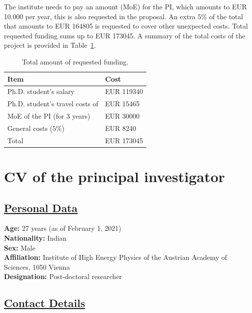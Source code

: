 \documentclass[a4paper,11pt]{article}
\begin{document}
{The institute needs to pay an amount (MoE) for the PI, which amounts to EUR 10.000 per year, 
this is also requested in the proposal.
An extra $5\%$ of the total that amounts to EUR 164805 is requested to cover other unexpected costs.  
Total requested funding sums up to EUR 173045.  
A summary of the total costs of the project is provided in Table~\ref{Tab:Total_cost}.
\begin{table}
\caption{Total amount of requested funding.}
\begin{tabular}{m{6 cm}| m{4 cm}}
Item & Cost  \\
\hline 
Ph.D. student's salary & EUR 119340  \\
Ph.D. student's travel costs of & EUR 15465 \\
MoE of the PI (for 3 years) & EUR 30000 \\
\hline
General costs ($5\%$) & EUR 8240  \\
\hline
Total & EUR 173045 
\end{tabular}
\label{Tab:Total_cost}
\end{table}

\newpage


\section{CV of the principal investigator}

\subsection*{\underline{Personal Data}}

\textbf{Age:} 27 years (as of February 1, 2021)\\
\textbf{Nationality:} Indian \\
\textbf{Sex:} Male \\
\textbf{Affiliation:} Institute of High Energy Physics of the Austrian Academy of Sciences, 1050 Vienna \\
\textbf{Designation:} Post-doctoral researcher 


\subsection*{\underline{Contact Details}}

}
\end{document}
